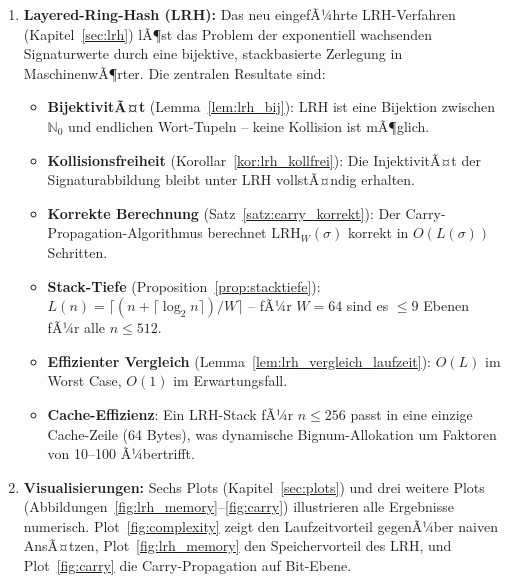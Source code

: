 ﻿\documentclass[a4paper,12pt]{article}
\theoremstyle{definition}
\begin{document}
\begin{enumerate}
  \item \textbf{Layered-Ring-Hash (LRH):} Das neu eingefÃ¼hrte LRH-Verfahren
        (Kapitel~\ref{sec:lrh}) lÃ¶st das Problem der exponentiell wachsenden
        Signaturwerte durch eine bijektive, stackbasierte Zerlegung in
        MaschinenwÃ¶rter. Die zentralen Resultate sind:
        \begin{itemize}
          \item \textbf{BijektivitÃ¤t} (Lemma~\ref{lem:lrh_bij}): LRH ist eine
                Bijektion zwischen $\mathbb{N}_0$ und endlichen Wort-Tupeln -- keine
                Kollision ist mÃ¶glich.
          \item \textbf{Kollisionsfreiheit} (Korollar~\ref{kor:lrh_kollfrei}):
                Die InjektivitÃ¤t der Signaturabbildung bleibt unter LRH vollstÃ¤ndig
                erhalten.
          \item \textbf{Korrekte Berechnung} (Satz~\ref{satz:carry_korrekt}): Der
                Carry-Propagation-Algorithmus berechnet $\mathrm{LRH}_W(\sigma)$
                korrekt in $O(L(\sigma))$ Schritten.
          \item \textbf{Stack-Tiefe} (Proposition~\ref{prop:stacktiefe}):
                $L(n) = \lceil (n + \lceil \log_2 n \rceil) / W \rceil$ -- fÃ¼r
                $W=64$ sind es $\leq 9$ Ebenen fÃ¼r alle $n \leq 512$.
          \item \textbf{Effizienter Vergleich} (Lemma~\ref{lem:lrh_vergleich_laufzeit}):
                $O(L)$ im Worst Case, $O(1)$ im Erwartungsfall.
          \item \textbf{Cache-Effizienz}: Ein LRH-Stack fÃ¼r $n \leq 256$ passt in
                eine einzige Cache-Zeile (64 Bytes), was dynamische Bignum-Allokation
                um Faktoren von 10--100 Ã¼bertrifft.
        \end{itemize}

  \item \textbf{Visualisierungen:} Sechs Plots (Kapitel~\ref{sec:plots}) und drei
        weitere Plots (Abbildungen~\ref{fig:lrh_memory}--\ref{fig:carry}) illustrieren
        alle Ergebnisse numerisch. Plot~\ref{fig:complexity} zeigt den
        Laufzeitvorteil gegenÃ¼ber naiven AnsÃ¤tzen, Plot~\ref{fig:lrh_memory} den
        Speichervorteil des LRH, und Plot~\ref{fig:carry} die Carry-Propagation
        auf Bit-Ebene.
\end{enumerate}

\end{document}
